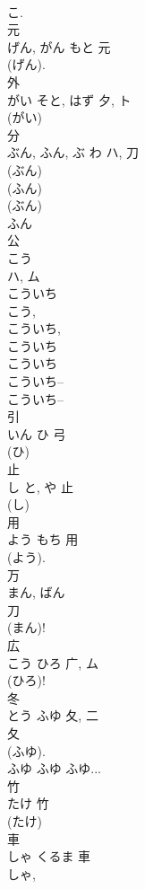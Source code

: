 \documentclass[8pt]{extreport}
\begin{document}
\begin{CJK}{UTF8}{min}
\\	こ.	
\\	元	
\\	げん, がん	もと	元	
\\	(げん). 
\\	外	
\\	がい	そと, はず	夕, ト	
\\	(がい) 
\\	分	
\\	ぶん, ふん, ぶ	わ	ハ, 刀	
\\	(ぶん) 
\\	(ふん) 
\\	(ぶん) 
\\	ふん 
\\	公	
\\	こう	
\\	ハ, ム	
\\	こういち
\\	こう, 
\\	こういち, 
\\	こういち 
\\	こういち
\\	こういち--
\\	こういち--
\\	引	
\\	いん	ひ	弓		
\\	(ひ) 
\\	止	
\\	し	と, や	止	
\\	(し) 
\\	用	
\\	よう	もち	用	
\\	(よう). 
\\	万	
\\	まん, ばん	
\\	刀		
\\	(まん)! 
\\	広	
\\	こう	ひろ	广, ム	
\\	(ひろ)!	
\\	冬	
\\	とう	ふゆ	夂, 二	
\\	夂 
\\	(ふゆ).	
\\	ふゆ ふゆ ふゆ...	
\\	竹	
\\	たけ	竹	
\\	(たけ) 
\\	車	
\\	しゃ	くるま	車	
\\	しゃ, 

\end{CJK}
\end{document}
